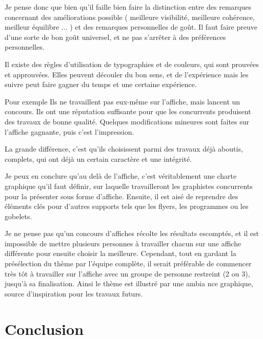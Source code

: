         Je pense donc que bien qu'il faille bien faire la distinction entre des remarques concernant des améliorations possible ( meilleure visibilité, meilleure cohérence, meilleur équilibre ... ) et des remarques personnelles de goût.
        Il faut faire preuve d'une sorte de bon goût universel, et ne pas s'arrêter à des préférences personnelles.
        
        Il existe des règles d'utilisation de typographies et de couleurs, qui sont prouvées  et approuvées. Elles peuvent découler du bon sens, et de l'expérience mais les suivre peut faire gagner du temps et une certaine expérience.

        
        Pour exemple %
        Ils ne travaillent pas eux-même sur l'affiche, mais lancent un concours. Ils ont une réputation suffisante pour que les concurrents produisent des travaux de bonne qualité.
        Quelques modifications mineures sont faites sur l'affiche gagnante, puis c'est l'impression.
        
        La grande différence, c'est qu'ils choisissent parmi des travaux déjà aboutis, complets, qui ont déjà un certain caractère et une intégrité. 
        
        Je peux en conclure qu'au delà de l'affiche, c'est véritablement une charte graphique qu'il faut définir, sur laquelle travailleront les graphistes concurrents pour la présenter sous forme d'affiche. Ensuite, il est aisé de reprendre des éléments clés pour d'autres supports tels que les flyers, les programmes ou les gobelets.
        
        Je ne pense pas qu'un concours d'affiches récolte les résultats escomptés, et il est impossible de mettre plusieurs personnes à travailler chacun sur une affiche différente pour ensuite choisir la meilleure.
        Cependant, tout en gardant la présélection du thème par l'équipe complète, il serait préférable de commencer très tôt à travailler sur l'affiche avec un groupe de personne restreint (2 ou 3), jusqu'à sa finalisation. Ainsi le thème est illustré par une ambia
nce graphique, source d'inspiration pour les travaux futurs.
        
        
\section{Conclusion}

